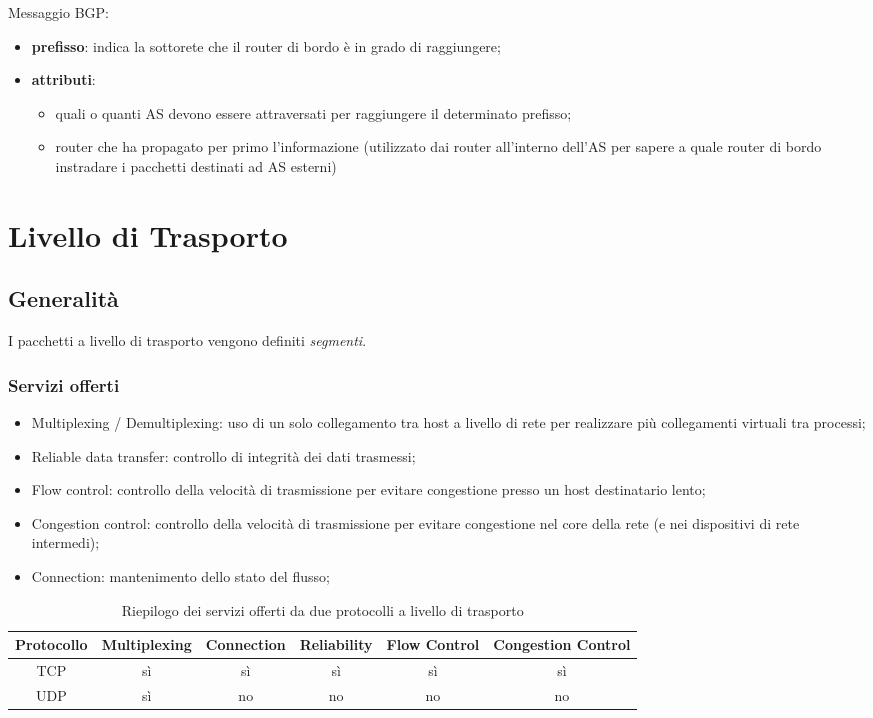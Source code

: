 \documentclass[12pt,a4paper]{article}
\begin{document}
Messaggio BGP:
\begin{itemize}
  \item \textbf{prefisso}: indica la sottorete che il router di bordo è
    in grado di raggiungere;
  \item \textbf{attributi}:
    \begin{itemize}
      \item quali o quanti AS devono essere attraversati per raggiungere
        il determinato prefisso;
      \item router che ha propagato per primo l'informazione (utilizzato
        dai router all'interno dell'AS per sapere a quale router di
        bordo instradare i pacchetti destinati ad AS esterni)
    \end{itemize}
\end{itemize}

\section{Livello di Trasporto}
\subsection{Generalità}
I pacchetti a livello di trasporto vengono definiti \emph{segmenti}.

\subsubsection{Servizi offerti}
\begin{itemize}
  \item Multiplexing / Demultiplexing: uso di un solo collegamento tra
    host a livello di rete per realizzare più collegamenti virtuali tra
    processi;
  \item Reliable data transfer: controllo di integrità dei dati
    trasmessi;
  \item Flow control: controllo della velocità di trasmissione per
    evitare congestione presso un host destinatario lento;
  \item Congestion control: controllo della velocità di trasmissione
    per evitare congestione nel core della rete (e nei dispositivi
    di rete intermedi);
  \item Connection: mantenimento dello stato del flusso;
\end{itemize}

\begin{table}[H]
\centering
\begin{tabular}{| c | c | c | c | c | c |}\hline
  Protocollo  & Multiplexing  & Connection  & Reliability & Flow Control  & Congestion Control  \\ \hline
  TCP         & sì            & sì          & sì          & sì            & sì                  \\ \hline
  UDP         & sì            & no          & no          & no            & no                  \\ \hline
\end{tabular}
\caption{Riepilogo dei servizi offerti da due protocolli a livello di trasporto}
\end{table}
\end{document}
